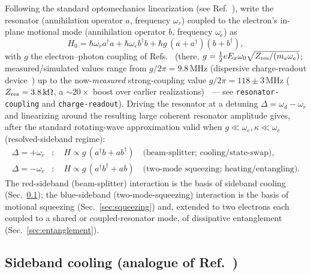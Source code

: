\documentclass[aps,prapplied,reprint,superscriptaddress,longbibliography]{revtex4-2}
\begin{document}
Following the standard optomechanics linearization (see Ref.~\cite{aspelmeyer2014cavity}), write the
resonator (annihilation operator $a$, frequency $\omega_r$) coupled to the electron's in-plane
motional mode (annihilation operator $b$, frequency $\omega_e$) as
\begin{equation}
H_0 = \hbar\omega_r a^\dagger a + \hbar \omega_e b^\dagger b + \hbar g\,(a + a^\dagger)(b + b^\dagger),
\end{equation}
with $g$ the electron--photon coupling of Refs.~\cite{koolstra2025impedance,castoria2025,koolstra2026strong}
(there, $g = \tfrac{1}{2} e E_x \omega_0 \sqrt{Z_{\rm res}/(m_e \omega_e)}$; measured/simulated values
range from $g/2\pi = 9.8\,\mathrm{MHz}$ (dispersive charge-readout device~\cite{castoria2025}) up to
the now-\emph{measured} strong-coupling value $g/2\pi = 118\pm3\,\mathrm{MHz}$
($Z_{\rm res} = 3.8\,\mathrm{k}\Omega$, a $\sim20\times$ boost over earlier
realizations)~\cite{koolstra2026strong} — see \texttt{resonator-coupling} and \texttt{charge-readout}).
Driving the resonator at a
detuning $\Delta = \omega_d - \omega_r$ and linearizing around the resulting large coherent
resonator amplitude gives, after the standard rotating-wave approximation valid when
$g \ll \omega_e, \kappa \ll \omega_e$ (resolved-sideband regime):
\begin{align}
\Delta = +\omega_e &: \quad H \propto g\,(a^\dagger b + a b^\dagger) \quad \text{(beam-splitter; cooling/state-swap)}, \\
\Delta = -\omega_e &: \quad H \propto g\,(a^\dagger b^\dagger + a b) \quad \text{(two-mode squeezing; heating/entangling)}.
\end{align}
The red-sideband (beam-splitter) interaction is the basis of sideband cooling
(Sec.~\ref{sec:cooling}); the blue-sideband (two-mode-squeezing) interaction is the basis of
motional squeezing (Sec.~\ref{sec:squeezing}) and, extended to two electrons each coupled to a
shared or coupled-resonator mode, of dissipative entanglement (Sec.~\ref{sec:entanglement}).

\subsection{Sideband cooling (analogue of Ref.~\cite{teufel2011sideband})}
\label{sec:cooling}
\end{document}
